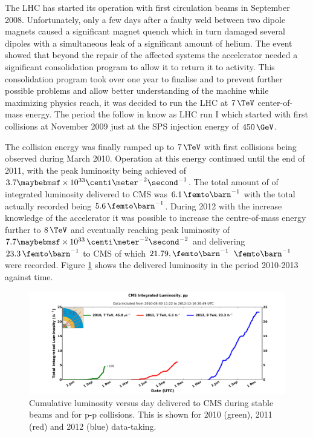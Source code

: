 The \gls{LHC} has started its operation with first circulation beams in September 2008. Unfortunately, only a few days after a faulty weld between two dipole magnets caused a significant magnet quench which in turn damaged several dipoles with a simultaneous leak of a significant amount of helium. The event showed that beyond the repair of the affected systems the accelerator needed a significant consolidation program to allow it to return it to activity\cite{ARTICLE:CMSReportIncident19Sep2008}. This consolidation program took over one year to finalise and to prevent further possible problems and allow better understanding of the machine while maximizing physics reach, it was decided to run the \gls{LHC} at $7\,\TeV$ center-of-mass energy.
The period the follow in know as \gls{LHC} run I which started with first collisions at November 2009 just at the \gls{SPS} injection energy of $450\,\GeV$. 

The collision energy was finally ramped up to $7\,\TeV$ with first collisions being observed during March 2010. Operation at this energy continued until the end of 2011, with the peak luminosity being achieved of $3.7 \times 10^{33} \centi\meter^{-2}\second^{-1}$. The total amount of of integrated luminosity delivered to \gls{CMS} was $6.1\,\femto\barn^{-1}$ with the total actually recorded being $5.6\,\femto\barn^{-1}$. During 2012 with the increase knowledge of the accelerator it was possible to increase the centre-of-mass energy further to $8\,\TeV$ and eventually reaching peak luminosity of $7.7 \times 10^{33}\,\centi\meter^{-2}\second^{-2}$ and delivering $23.3\,\femto\barn^{-1}$ to \gls{CMS} of which $21.79,\femto\barn^{-1}$  $\femto\barn^{-1}$ were recorded. Figure \ref{FIGURE:ExperimentalApparatus_CMS_IntegratedLumi_pp_2010-2012} shows the delivered luminosity in the period 2010-2013 against time.

\begin{figure}[!htb]
  \centering
  \includegraphics[width=1.00\textwidth]{Chapter02/CMS/Images/CMS_IntegratedLumi_pp_2010-2012}
  \caption{Cumulative luminosity versus day delivered to CMS during stable beams and for p-p collisions. This is shown for 2010 (green), 2011 (red) and 2012 (blue) data-taking.}
  \label{FIGURE:ExperimentalApparatus_CMS_IntegratedLumi_pp_2010-2012}
\end{figure}

